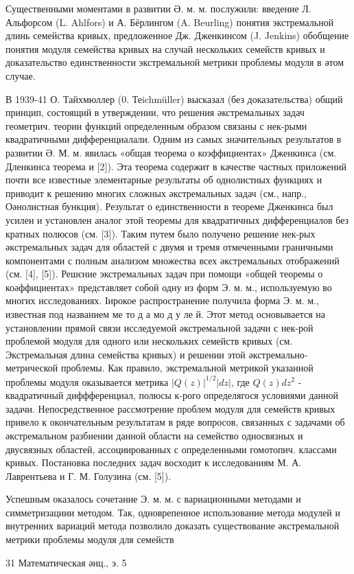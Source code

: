 \documentclass[10pt]{article}
\begin{document}
Существенными моментами в развитии Ә. м. м. послужили: введение Л. Альфорсом (L. Ahlfors) и А. Бёрлингом (A. Beurling) понятия экстремальной длинь семейства кривых, предложенное Дж. Дженкинсом (J. Jenkins) обобщение понятия модуля семейства кривых на случай нескольких семейств кривых и доказательство единственности экстремальной метрики проблемы модуля в әтом случае.



В 1939-41 О. Тайхмюллер (0. Теichmüller) высказал (без доказательства) общий принцип, состоящий в утверждении, что решения әкстремальных задач геометрич. теории функций определенным образом связаны с нек-рыми квадратичными дифференциалали. Одним из самых значительных результатов в развитии Ә. М. м. явилась «общая теорема о коэффициентах» Дженкинса (см. Дленкинса теорема и [2]). Эта теорема содержит в качестве частных приложений почти все известные элементарные результаты об однолистных функциях и приводит к решению многих сложных әкстремальных задач (см., напр., Оәнолистная бункция). Результат о единственности в теореме Дженкинса был усилен и установлен аналог этой теоремы для квадратичных дифференциалов без кратных полюсов (см. [3]). Таким путем было получено решение нек-рых әкстремальных задач для областей с двумя и тремя отмеченными граничными компонентами с полным анализом множества всех әкстремальных отображений (см. [4], [5]). Решєние экстремальных задач при помощи «общей теоремы о коәффициентах» представляет собой одну из форм Э. м. м., используемую во многих исследованиях. Іирокое распространение получила форма Э. м. м., известная под названием ме то д а мо д у ле й. Этот метод основывается на установлении прямой связи исследуемой әкстремальной задачи с нек-рой проблемой модуля для одного или нескольких семейств кривых (см. Экстремальная длина семейства кривых) и решении этой әкстремально-метрической проблемы. Как правило, экстремальной метрикой указанной проблемы модуля оказывается метрика $|Q(z)|^{1 / 2}|d z|$, где $Q(z) d z^{2}$ - квадратичный диффференциал, полюсы к-рого определягося условиями данной задачи. Непосредственное рассмотрение проблем модуля для семейств кривых привело к окончательным результатам в ряде вопросов, связанных с задачами об әкстремальном разбиении данной области на семейство односвязных и двусвязных областей, ассоциированных с определенными гомотопич. классами кривых. Постановка последних задач восходит к исследованиям М. А. Лаврентьева и Г. М. Голузина (см. [5]).



Успешным оказалось сочетание Э. м. м. с вариационными методами и симметризациии методом. Так, одноврепенное использование метода модулей и внутренних вариаций метода позволило доказать существование әкстремальной метрики проблемы модуля для семейств



31 Математическая әнц., э. 5
\end{document}
